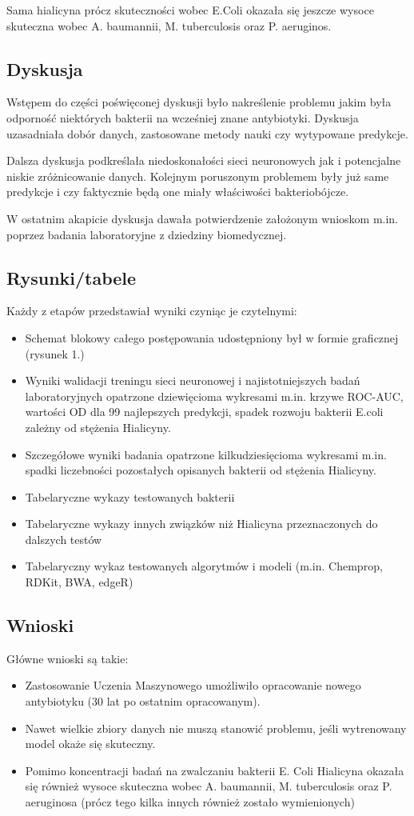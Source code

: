 Sama hialicyna prócz skuteczności wobec E.Coli okazała się jeszcze wysoce skuteczna wobec A. baumannii, M. tuberculosis oraz P. aeruginos.

\subsection{Dyskusja}
Wstępem do części poświęconej dyskusji było nakreślenie problemu jakim była odporność niektórych bakterii na wcześniej znane antybiotyki. Dyskusja uzasadniała dobór danych, zastosowane metody nauki czy wytypowane predykcje.

Dalsza dyskusja podkreślała niedoskonałości sieci neuronowych jak i potencjalne niskie zróżnicowanie danych. Kolejnym poruszonym problemem były już same predykcje i czy faktycznie będą one miały właściwości bakteriobójcze.

W ostatnim akapicie dyskusja dawała potwierdzenie założonym wnioskom m.in. poprzez badania laboratoryjne z dziedziny biomedycznej.

\subsection{Rysunki/tabele}
Każdy z etapów przedstawiał wyniki czyniąc je czytelnymi:
\begin{itemize}
    \item Schemat blokowy całego postępowania udostępniony był w formie graficznej (rysunek 1.)
    \item Wyniki walidacji treningu sieci neuronowej i najistotniejszych badań laboratoryjnych opatrzone dziewięcioma wykresami m.in. krzywe ROC-AUC, wartości OD dla 99 najlepszych predykcji, spadek rozwoju bakterii E.coli zależny od stężenia Hialicyny.
    \item Szczegółowe wyniki badania opatrzone kilkudziesięcioma wykresami m.in. spadki liczebności pozostałych opisanych bakterii od stężenia Hialicyny.
    \item Tabelaryczne wykazy testowanych bakterii
    \item Tabelaryczne wykazy innych związków niż Hialicyna przeznaczonych do dalszych testów
    \item Tabelaryczny wykaz testowanych algorytmów i modeli (m.in. Chemprop, RDKit, BWA, edgeR)
\end{itemize}

\subsection{Wnioski}
Główne wnioski są takie:
\begin{itemize}
    \item Zastosowanie Uczenia Maszynowego umożliwiło opracowanie nowego antybiotyku (30 lat po ostatnim opracowanym).
    \item Nawet wielkie zbiory danych nie muszą stanowić problemu, jeśli wytrenowany model okaże się skuteczny.
    \item Pomimo koncentracji badań na zwalczaniu bakterii E. Coli Hialicyna okazała się również wysoce skuteczna wobec A. baumannii, M. tuberculosis oraz P. aeruginosa (prócz tego kilka innych również zostało wymienionych)
\end{itemize}